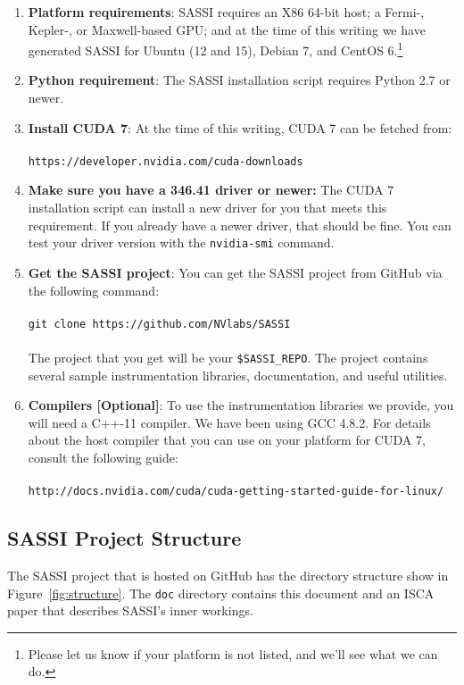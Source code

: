 \begin{enumerate}
\item {\bf Platform requirements}: SASSI requires an X86 64-bit host;
  a Fermi-, Kepler-, or Maxwell-based GPU; and at the time of this
  writing we have generated SASSI for Ubuntu (12 and 15), Debian
  7, and CentOS 6.\footnote{Please let us know if your platform
    is not listed, and we'll see what we can do.}
\item {\bf Python requirement}: The SASSI installation script requires
  Python 2.7 or newer.
\item {\bf Install CUDA 7}: At the time of this writing, CUDA 7 can
  be fetched
  from:\\ \\  \texttt{https://developer.nvidia.com/cuda-downloads} \\
\item {\bf Make sure you have a 346.41 driver or newer:} The CUDA 7
  installation script can install a new driver for you that meets this
  requirement.  If you already have a newer driver, that should be
  fine.  You can test your driver version with the \texttt{nvidia-smi}
  command.
\item {\bf Get the SASSI project}: You can get the SASSI project from
  GitHub via the following command: \\ \\ \texttt{git clone
    https://github.com/NVlabs/SASSI} \\ \\
  The project that you get will be your \texttt{\$SASSI\_REPO}.  The
  project contains several sample instrumentation libraries,
  documentation, and useful utilities.
\item {\bf Compilers [Optional]}: To use the instrumentation libraries
  we provide, you will need a C++-11 compiler.  We have been using GCC
  4.8.2.  For details about the host compiler that you can use on your
  platform for CUDA 7, consult the following
  guide:\\ \\ \texttt{http://docs.nvidia.com/cuda/cuda-getting-started-guide-for-linux/}
\end{enumerate}

\subsection{SASSI Project Structure}

The SASSI project that is hosted on GitHub has the directory structure
show in Figure~\ref{fig:structure}.  The \texttt{doc} directory
contains this document and an ISCA paper that describes SASSI's inner
workings.

